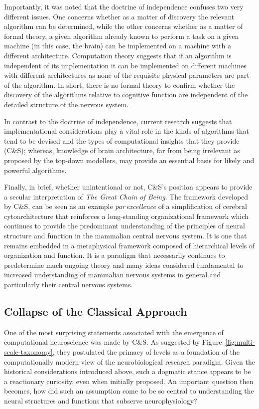 \documentclass[11pt,3p,twocolumn]{JMN}
\begin{document}
Importantly, it was noted that the doctrine of independence confuses two very different issues. One concerns whether as a matter of discovery the relevant algorithm can be determined, while the other concerns whether as a matter of formal theory, a given algorithm already known to perform a task on a given machine (in this case, the brain) can be implemented on a machine with a different architecture. Computation theory suggests that if an algorithm is independent of its implementation it can be implemented on different machines with different architectures as none of the requisite physical parameters are part of the algorithm. In short, there is no formal theory to confirm whether the discovery of the algorithms relative to cognitive function are independent of the detailed structure of the nervous system.

In contrast to the doctrine of independence, current research suggests that implementational considerations play a vital role in the kinds of algorithms that tend to be devised and the types of computational insights that they provide (C\&S); whereas, knowledge of brain architecture, far from being irrelevant as proposed by the top-down modellers, may provide an essential basis for likely and powerful algorithms.

Finally, in brief, whether unintentional or not, C\&S's position appears to provide a secular interpretation of {\it{The Great Chain of Being}}. The framework developed by C\&S, can be seen as an example {\it{par\,excellence}} of a simplification of cerebral cytoarchitecture that reinforces a long-standing organizational framework which continues to provide the predominant understanding of the principles of neural structure and function in the mammalian central nervous system. It is one that remains embedded in a metaphysical framework composed of hierarchical levels of organization and function. It is a paradigm that necessarily continues to predetermine much ongoing theory and many ideas considered fundamental to increased understanding of mammalian nervous systems in general and particularly their central nervous systems.

\subsection{Collapse of the Classical Approach}

One of the most surprising statements associated with the emergence of computational neuroscience was made by C\&S. As suggested by Figure~\ref{fig:multi-scale-taxonomy}, they postulated the primacy of levels as a foundation of the computationally modern view of the neurobiological research paradigm. Given the historical considerations introduced above, such a dogmatic stance appears to be a reactionary curiosity, even when initially proposed. An important question then becomes, how did such an assumption come to be so central to understanding the neural structures and functions that subserve neurophysiology?
\end{document}
